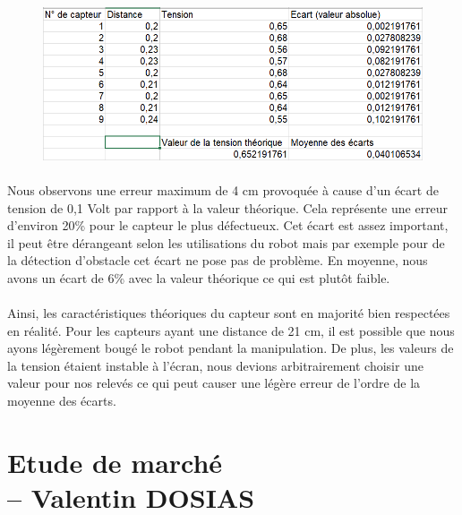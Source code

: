 \documentclass[oneside,a4paper,12pt]{article}
\begin{document}
	\begin{figure}[h]
		\centering
		\includegraphics[width=12cm]{tab2.png}
	\end{figure}
	
	\paragraph{}
	Nous observons une erreur maximum de 4 cm provoquée à cause d’un écart de tension de 0,1 Volt par rapport à la valeur théorique. Cela représente une erreur d'environ 20\% pour le capteur le plus défectueux. Cet écart est assez important, il peut être dérangeant selon les utilisations du robot mais par exemple pour de la détection d’obstacle cet écart ne pose pas de problème. En moyenne, nous avons un écart de 6\% avec la valeur théorique ce qui est plutôt faible.
	\paragraph{}
	Ainsi, les caractéristiques théoriques du capteur sont en majorité bien respectées en réalité. Pour les capteurs ayant une distance de 21 cm, il est possible que nous ayons légèrement bougé le robot pendant la manipulation. De plus, les valeurs de la tension étaient instable à l’écran, nous devions arbitrairement choisir une valeur pour nos relevés ce qui peut causer une légère erreur de l’ordre de la moyenne des écarts.\\
	
	
	\section{Etude de marché\\ -- Valentin DOSIAS}
\end{document}
